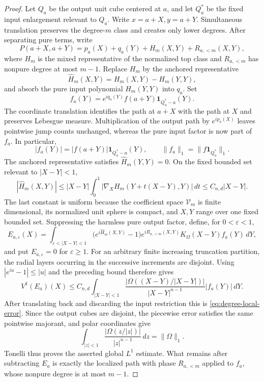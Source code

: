 \documentclass[11pt]{article}
\numberwithin{equation}{section}
\theoremstyle{remark}
\theoremstyle{definition}
\newcommand{\norm}[1]{\lVert #1\rVert}
\begin{document}
\begin{proof}
Let $Q_a$ be the output unit cube centered at $a$, and let $Q_a^*$ be the
fixed input enlargement relevant to $Q_a$.  Write $x=a+X,y=a+Y$.
Simultaneous translation preserves the degree-$m$ class and creates only
lower degrees.  After separating pure terms, write
\[
 P(a+X,a+Y)=p_a(X)+q_a(Y)+H_m(X,Y)+R_{a,<m}(X,Y),
\]
where $H_m$ is the mixed representative of the normalized top class and
$R_{a,<m}$ has nonpure degree at most $m-1$.  Replace $H_m$ by the anchored
representative
\[
 \widehat H_m(X,Y)=H_m(X,Y)-H_m(Y,Y),
\]
and absorb the pure input polynomial $H_m(Y,Y)$ into $q_a$.  Set
\[
 f_a(Y)=e^{iq_a(Y)}f(a+Y)\mathbf1_{Q_a^*-a}(Y).
\]
The coordinate translation identifies the path at $a+X$ with the path at
$X$ and preserves Lebesgue measure.  Multiplication of the output path by
$e^{ip_a(X)}$ leaves pointwise jump counts unchanged, whereas the pure
input factor is now part of $f_a$.  In particular,
\[
 |f_a(Y)|=|f(a+Y)|\mathbf1_{Q_a^*-a}(Y),
 \qquad
 \norm{f_a}_1=\norm{f\mathbf1_{Q_a^*}}_1.
\]
The anchored representative satisfies $\widehat H_m(Y,Y)=0$.  On the
fixed bounded set relevant to
$|X-Y|<1$,
\[
 |\widehat H_m(X,Y)|
 \le |X-Y|\int_0^1
 |\nabla_XH_m(Y+t(X-Y),Y)|\,dt
 \le C_{n,d}|X-Y|.
\]
The last constant is uniform because the coefficient space
$\mathcal V_m$ is finite dimensional, its normalized unit sphere is
compact, and $X,Y$ range over one fixed bounded set.  Suppressing the
harmless pure output factor, define, for $0<\varepsilon<1$,
\[
 E_{a,\varepsilon}(X)
 =\int_{\varepsilon<|X-Y|<1}
   \bigl(e^{i\widehat H_m(X,Y)}-1\bigr)
   e^{iR_{a,<m}(X,Y)}
   K_\Omega(X-Y)f_a(Y)\,dY,
\]
and put $E_{a,\varepsilon}=0$ for $\varepsilon\ge1$.  For an arbitrary
finite increasing truncation partition, the radial layers occurring in
the successive increments are disjoint.  Using
$|e^{iu}-1|\le|u|$ and the preceding bound therefore gives
\[
 V^1(E_a)(X)
 \le C_{n,d}\int_{|X-Y|<1}
   \frac{|\Omega((X-Y)/|X-Y|)|}{|X-Y|^{n-1}}
   |f_a(Y)|\,dY.
\]
After translating back and discarding the input restriction this is
\eqref{eq:degree-local-error}.  Since the output cubes are disjoint, the
piecewise error satisfies the same pointwise majorant, and polar
coordinates give
\[
 \int_{|z|<1}
  \frac{|\Omega(z/|z|)|}{|z|^{n-1}}\,dz
 =\|\Omega\|_1.
\]
Tonelli thus proves the asserted global $L^1$ estimate.  What remains
after subtracting $E_a$ is exactly the localized path with phase
$R_{a,<m}$ applied to $f_a$, whose nonpure degree is at most $m-1$.
\end{proof}
\end{document}
